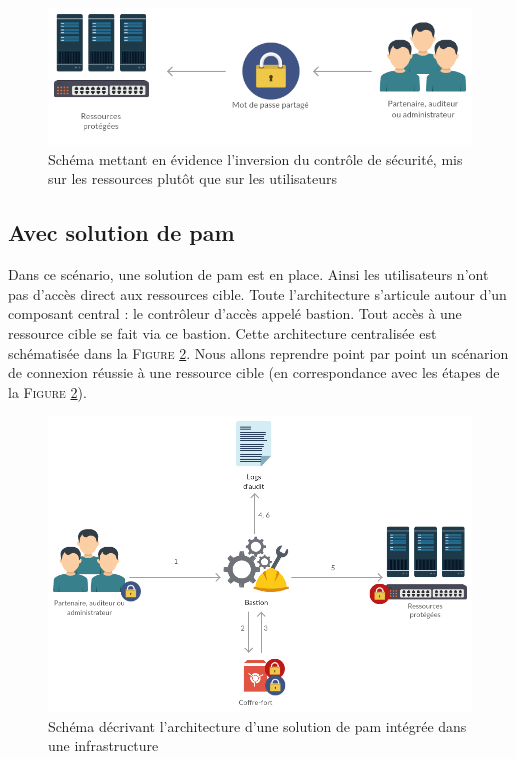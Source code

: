 \begin{figure}[!ht]
    \center
    \includegraphics[width=\textwidth]{./images/ressource_centered.png}
    \caption{Schéma mettant en évidence l'inversion du contrôle de sécurité, mis sur les ressources plutôt que sur les utilisateurs}
    \label{fig:invcont}
\end{figure}

\subsection{Avec solution de \gls{pam}}
\label{par:withpam}

Dans ce scénario, une solution de \gls{pam} est en place. Ainsi les utilisateurs n'ont pas d'accès direct aux ressources cible. Toute l'architecture s'articule autour d'un composant central : le contrôleur d'accès appelé \gls{bastion}. Tout accès à une ressource cible se fait via ce \gls{bastion}. Cette architecture centralisée est schématisée dans la \textsc{Figure} \ref{fig:schempam}. Nous allons reprendre point par point un scénarion de connexion réussie à une ressource cible (en correspondance avec les étapes de la \textsc{Figure} \ref{fig:schempam}).

\begin{figure}[!ht]
    \center
    \includegraphics[width=\textwidth]{./images/Schema_PAM.png}
    \caption{Schéma décrivant l'architecture d'une solution de \gls{pam} intégrée dans une infrastructure}
    \label{fig:schempam}
\end{figure}

